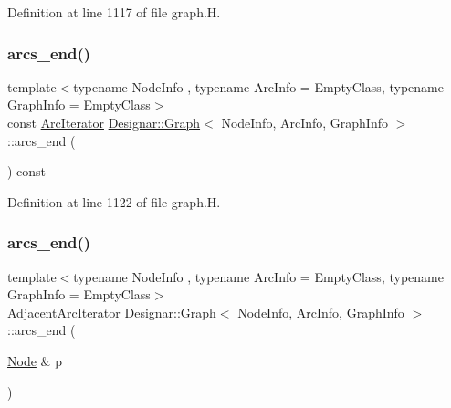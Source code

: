 Definition at line 1117 of file graph.\+H.

\mbox{\label{class_designar_1_1_graph_a81269c52d854ceb3d000f2642fcb52ae}} 
\subsubsection{\texorpdfstring{arcs\+\_\+end()}{arcs\_end()}\hspace{0.1cm}{\footnotesize\ttfamily [2/4]}}
{\footnotesize\ttfamily template$<$typename Node\+Info , typename Arc\+Info  = Empty\+Class, typename Graph\+Info  = Empty\+Class$>$ \\
const \hyperlink{class_designar_1_1_graph_1_1_arc_iterator}{Arc\+Iterator} \hyperlink{class_designar_1_1_graph}{Designar\+::\+Graph}$<$ Node\+Info, Arc\+Info, Graph\+Info $>$\+::arcs\+\_\+end (\begin{DoxyParamCaption}{ }\end{DoxyParamCaption}) const\hspace{0.3cm}{\ttfamily [inline]}}



Definition at line 1122 of file graph.\+H.

\mbox{\label{class_designar_1_1_graph_a68ee235ab79790c00e1a69d518b9c076}} 
\subsubsection{\texorpdfstring{arcs\+\_\+end()}{arcs\_end()}\hspace{0.1cm}{\footnotesize\ttfamily [3/4]}}
{\footnotesize\ttfamily template$<$typename Node\+Info , typename Arc\+Info  = Empty\+Class, typename Graph\+Info  = Empty\+Class$>$ \\
\hyperlink{class_designar_1_1_graph_1_1_adjacent_arc_iterator}{Adjacent\+Arc\+Iterator} \hyperlink{class_designar_1_1_graph}{Designar\+::\+Graph}$<$ Node\+Info, Arc\+Info, Graph\+Info $>$\+::arcs\+\_\+end (\begin{DoxyParamCaption}\item[{\hyperlink{class_designar_1_1_graph_a5dfc7dba9d092ac489c72e40390c37d0}{Node} \&}]{p }\end{DoxyParamCaption})\hspace{0.3cm}{\ttfamily [inline]}}



